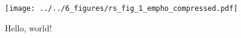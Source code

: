\kant[0-3]

\begin{wrapfigure}{r}{0.4\textwidth}
    \begin{center}
        \texttt{[image: ../../6\_figures/rs\_fig\_1\_empho\_compressed.pdf]}
    \end{center}
    \caption{Hello, world!}
\end{wrapfigure}

\kant[4-7]